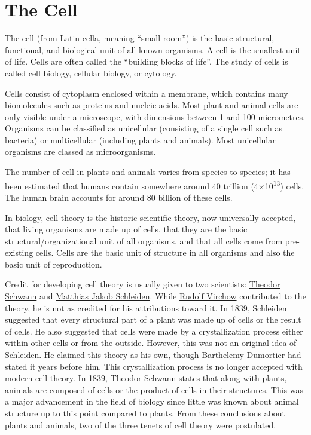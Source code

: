 \hypertarget{the-cell}{%
\chapter{The Cell}\label{the-cell}}

The \href{https://en.wikipedia.org/wiki/Cell_(biology)}{cell} (from Latin cella, meaning ``small room'') is the basic structural, functional, and biological unit of all known organisms. A cell is the smallest unit of life. Cells are often called the ``building blocks of life''. The study of cells is called cell biology, cellular biology, or cytology.

Cells consist of cytoplasm enclosed within a membrane, which contains many biomolecules such as proteins and nucleic acids. Most plant and animal cells are only visible under a microscope, with dimensions between 1 and 100 micrometres. Organisms can be classified as unicellular (consisting of a single cell such as bacteria) or multicellular (including plants and animals). Most unicellular organisms are classed as microorganisms.

The number of cell in plants and animals varies from species to species; it has been estimated that humans contain somewhere around 40 trillion (4×10\textsuperscript{13}) cells. The human brain accounts for around 80 billion of these cells.

In biology, cell theory is the historic scientific theory, now universally accepted, that living organisms are made up of cells, that they are the basic structural/organizational unit of all organisms, and that all cells come from pre-existing cells. Cells are the basic unit of structure in all organisms and also the basic unit of reproduction.

Credit for developing cell theory is usually given to two scientists: \href{https://en.wikipedia.org/wiki/Theodor_Schwann}{Theodor Schwann} and \href{https://en.wikipedia.org/wiki/Matthias_Jakob_Schleiden}{Matthias Jakob Schleiden}. While \href{https://en.wikipedia.org/wiki/Rudolf_Virchow}{Rudolf Virchow} contributed to the theory, he is not as credited for his attributions toward it. In 1839, Schleiden suggested that every structural part of a plant was made up of cells or the result of cells. He also suggested that cells were made by a crystallization process either within other cells or from the outside. However, this was not an original idea of Schleiden. He claimed this theory as his own, though \href{https://en.wikipedia.org/wiki/Barthélemy_Charles_Joseph_Dumortier}{Barthelemy Dumortier} had stated it years before him. This crystallization process is no longer accepted with modern cell theory. In 1839, Theodor Schwann states that along with plants, animals are composed of cells or the product of cells in their structures. This was a major advancement in the field of biology since little was known about animal structure up to this point compared to plants. From these conclusions about plants and animals, two of the three tenets of cell theory were postulated.

